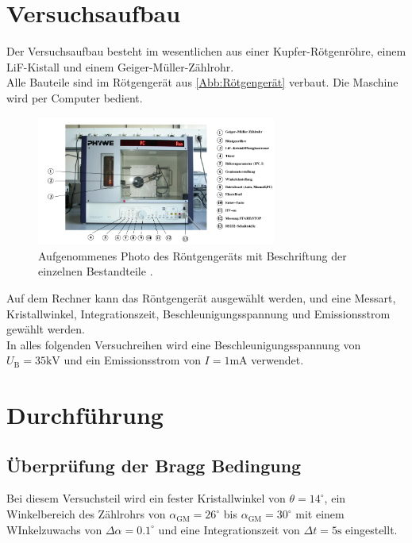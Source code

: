 \section{Versuchsaufbau}
\label{sec:Versuchsaufbau}

Der Versuchsaufbau besteht im wesentlichen aus einer Kupfer-Rötgenröhre,
einem LiF-Kistall und einem Geiger-Müller-Zählrohr.\\
Alle Bauteile sind im Rötgengerät aus \autoref{Abb:Rötgengerät} verbaut.
Die Maschine wird per Computer bedient.

\begin{figure}
    \centering
    \includegraphics[width=0.7\textwidth]{Bilder/Röntgengerät.png}
    \caption{Aufgenommenes Photo des Röntgengeräts mit Beschriftung der einzelnen Bestandteile \cite{sample}.}
    \label{Abb:Rötgengerät}
\end{figure}

Auf dem Rechner kann das Röntgengerät ausgewählt werden, und eine Messart,
Kristallwinkel, Integrationszeit, Beschleunigungsspannung und Emissionsstrom 
gewählt werden.\\
In alles folgenden Versuchreihen wird eine Beschleunigungsspannung von 
$U_{\mathrm{B}} = 35 \si{\kilo\volt}$ und ein Emissionsstrom von $I = 1 \si{\milli\ampere}$
verwendet.\\

\section{Durchführung}
\label{sec:Durchführung}

\subsection{Überprüfung der Bragg Bedingung}

Bei diesem Versuchsteil wird ein fester Kristallwinkel
von $\theta = 14 ^\circ$, ein Winkelbereich des Zählrohrs
von $\alpha_{\mathrm{GM}} = 26 ^\circ$ bis $\alpha_{\mathrm{GM}} = 30 ^\circ$
mit einem WInkelzuwachs von $\Delta \alpha = 0.1 ^\circ$ und eine 
Integrationszeit von $\Delta t = 5 \si{\second}$ eingestellt.\\

